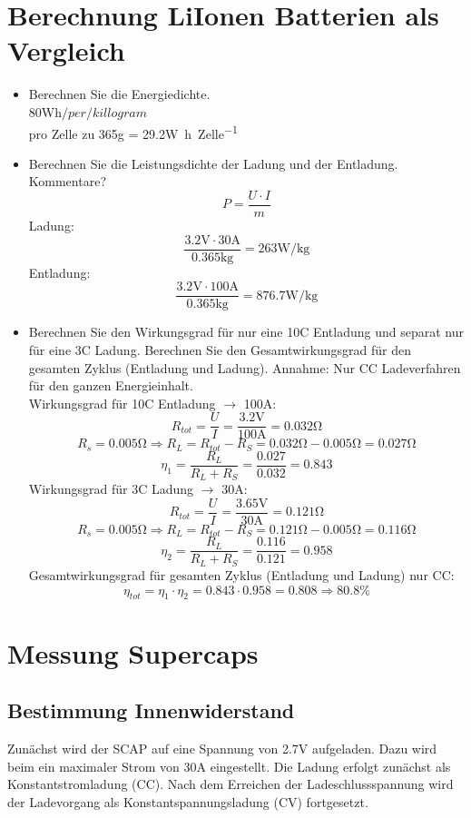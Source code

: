 \documentclass[a4,paper,fleqn]{article}
\begin{document}
\section{Berechnung LiIonen Batterien als Vergleich}
\begin{itemize}
\item Berechnen Sie die Energiedichte. \\
    $80\si{\watt\hour/per/killogram}$ \\
    pro Zelle zu 365\si{\gram} = 29.2\si{\watt\hour\per Zelle}
\item Berechnen Sie die Leistungsdichte der Ladung und der Entladung. 
Kommentare? \\
    \[ P = \frac{U \cdot I}{m} \]
    Ladung: 
    \[ \frac{3.2\si{\volt} \cdot 30\si{\ampere}}{0.365\si{\kilogram}} = 263 \si{\watt\per\kilogram} \]
    Entladung: 
    \[ \frac{3.2\si{\volt} \cdot 100\si{\ampere}}{0.365\si{\kilogram}} = 876.7 \si{\watt\per\kilogram} \]
\item  Berechnen Sie den Wirkungsgrad für nur eine 10C Entladung und separat 
nur für eine 3C Ladung.  Berechnen Sie den Gesamtwirkungsgrad für den 
gesamten Zyklus (Entladung und Ladung).  Annahme: Nur CC Ladeverfahren für 
den ganzen Energieinhalt. \\
    Wirkungsgrad für 10C Entladung $\to$ 100\si{\ampere}: 
    \[ R_{tot} = \frac{U}{I} = \frac{3.2\si{\volt}}{100\si{\ampere}} 
    = 0.032\si{\ohm} \]
    \[ R_s = 0.005\si{\ohm} \Rightarrow R_L 
    = R_{tot} - R_S = 0.032\si{\ohm} - 0.005\si{\ohm} = 0.027\si{\ohm} \]
    \[ \eta_1 = \frac{R_L}{R_L + R_S} = \frac{0.027}{0.032} = 0.843 \]
    Wirkungsgrad für 3C Ladung $\to$ 30\si{\ampere}: 
    \[ R_{tot} = \frac{U}{I} = \frac{3.65\si{\volt}}{30\si{\ampere}} 
    = 0.121\si{\ohm} \]
    \[ R_s = 0.005\si{\ohm} \Rightarrow R_L 
    = R_{tot} - R_S = 0.121\si{\ohm} - 0.005\si{\ohm} = 0.116\si{\ohm} \]
    \[ \eta_2 = \frac{R_L}{R_L + R_S} = \frac{0.116}{0.121} = 0.958 \]
    Gesamtwirkungsgrad für gesamten Zyklus (Entladung und Ladung) nur CC: \\
    \[ \eta_{tot} = \eta_1 \cdot \eta_2 = 0.843 \cdot 0.958 
    = 0.808 \Rightarrow 80.8\% \]
\end{itemize}

\section{Messung Supercaps}
\subsection{Bestimmung Innenwiderstand}
Zunächst wird der SCAP auf eine Spannung von 2.7\si{\volt} aufgeladen. Dazu 
wird beim ein maximaler Strom von 30\si{\ampere} eingestellt. Die Ladung 
erfolgt zunächst als Konstantstromladung (CC). Nach dem Erreichen der 
Ladeschlussspannung wird der Ladevorgang als Konstantspannungsladung (CV) 
fortgesetzt. 
\end{document}
